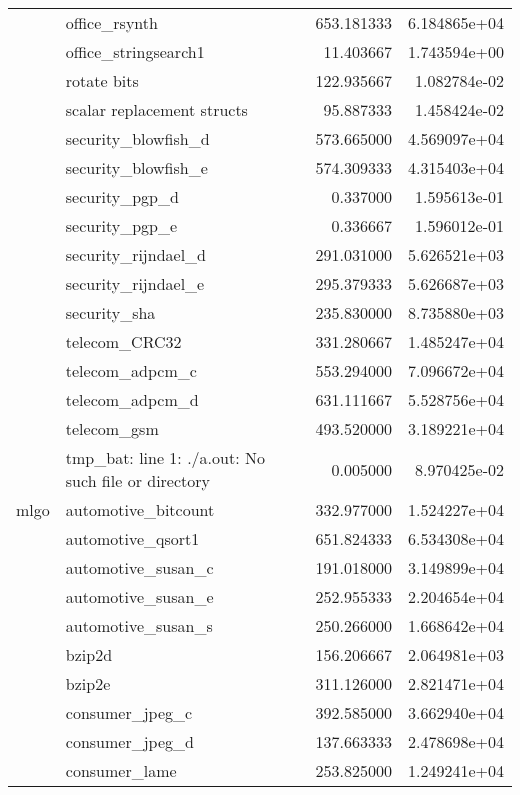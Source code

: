 \begin{table*}
\begin{center}
\begin{tabular}{llrr}
       & office\_rsynth &    653.181333 &  6.184865e+04 \\
       & office\_stringsearch1 &     11.403667 &  1.743594e+00 \\
       & rotate bits &    122.935667 &  1.082784e-02 \\
       & scalar replacement structs &     95.887333 &  1.458424e-02 \\
       & security\_blowfish\_d &    573.665000 &  4.569097e+04 \\
       & security\_blowfish\_e &    574.309333 &  4.315403e+04 \\
       & security\_pgp\_d &      0.337000 &  1.595613e-01 \\
       & security\_pgp\_e &      0.336667 &  1.596012e-01 \\
       & security\_rijndael\_d &    291.031000 &  5.626521e+03 \\
       & security\_rijndael\_e &    295.379333 &  5.626687e+03 \\
       & security\_sha &    235.830000 &  8.735880e+03 \\
       & telecom\_CRC32 &    331.280667 &  1.485247e+04 \\
       & telecom\_adpcm\_c &    553.294000 &  7.096672e+04 \\
       & telecom\_adpcm\_d &    631.111667 &  5.528756e+04 \\
       & telecom\_gsm &    493.520000 &  3.189221e+04 \\
       & tmp\_bat: line 1: ./a.out: No such file or directory &      0.005000 &  8.970425e-02 \\
mlgo & automotive\_bitcount &    332.977000 &  1.524227e+04 \\
       & automotive\_qsort1 &    651.824333 &  6.534308e+04 \\
       & automotive\_susan\_c &    191.018000 &  3.149899e+04 \\
       & automotive\_susan\_e &    252.955333 &  2.204654e+04 \\
       & automotive\_susan\_s &    250.266000 &  1.668642e+04 \\
       & bzip2d &    156.206667 &  2.064981e+03 \\
       & bzip2e &    311.126000 &  2.821471e+04 \\
       & consumer\_jpeg\_c &    392.585000 &  3.662940e+04 \\
       & consumer\_jpeg\_d &    137.663333 &  2.478698e+04 \\
       & consumer\_lame &    253.825000 &  1.249241e+04 \\

\end{tabular}
\end{center}
\end{table*}
